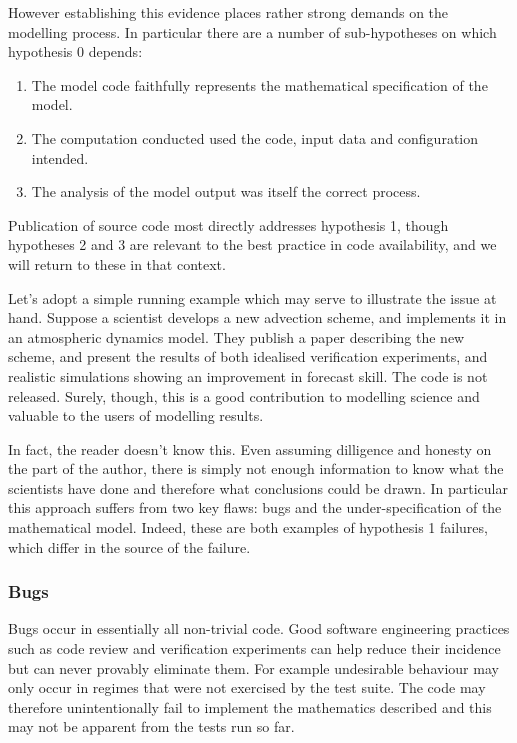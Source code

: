 \documentclass[a4paper,11pt]{article}
\begin{document}
However establishing this evidence places rather strong demands on the
modelling process. In particular there are a number of sub-hypotheses on
which hypothesis 0 depends:
\begin{enumerate}
\item The model code faithfully represents the mathematical specification of
  the model.
\item The computation conducted used the code, input data and configuration intended.
\item The analysis of the model output was itself the correct process.
\end{enumerate}
Publication of source code most directly addresses hypothesis 1, though
hypotheses 2 and 3 are relevant to the best practice in code availability,
and we will return to these in that context.

Let's adopt a simple running example which may serve to illustrate the issue
at hand. Suppose a scientist develops a new advection scheme, and implements
it in an atmospheric dynamics model. They publish a paper describing the new
scheme, and present the results of both idealised verification experiments,
and realistic simulations showing an improvement in forecast skill. The code
is not released. Surely, though, this is a good contribution to modelling
science and valuable to the users of modelling results.

In fact, the reader doesn't know this. Even assuming dilligence and honesty
on the part of the author, there is simply not enough information to know
what the scientists have done and therefore what conclusions could be
drawn. In particular this approach suffers from two key flaws: bugs and the
under-specification of the mathematical model. Indeed, these are both
examples of hypothesis 1 failures, which differ in the source of the
failure.

\subsubsection{Bugs}

Bugs occur in essentially all non-trivial code. Good software engineering
practices such as code review and verification experiments can help reduce
their incidence but can never provably eliminate them. For example
undesirable behaviour may only occur in regimes that were not exercised by
the test suite. The code may therefore unintentionally fail to implement the
mathematics described and this may not be apparent from the tests run so
far.
\end{document}
